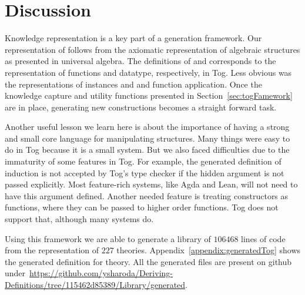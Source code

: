 \section{Discussion}
\label{sec:generation:discussion}
Knowledge representation is a key part of a generation framework. Our representation of  follows from the axiomatic representation of algebraic structures as presented in universal algebra. The definitions of  and  corresponds to the representation of functions and datatype, respectively, in Tog. Less obvious was the representations of instances  and  and function application. 
Once the knowledge capture and utility functions presented in Section~\ref{sec:togFamework} are in place, generating new constructions becomes a straight forward task. 

Another useful lesson we learn here is about the importance of having a strong and small core language for manipulating structures. Many things were easy to do in Tog because it is a small system. But we also faced difficulties due to the immaturity of some features in Tog.  
For example, the generated definition of induction is not accepted by Tog's type checker if the hidden argument  is not passed explicitly. Most feature-rich systems, like Agda and Lean, will not need to have this argument defined. Another needed feature is treating constructors as functions, where they can be passed to higher order functions. Tog does not support that, although many systems do.  

Using this framework we are able to generate a library of $106468$ lines of code from the representation of $227$ theories. Appendix~\ref{appendix:generatedTog} shows the generated definition for  theory. All the generated files are present on github under~\url{https://github.com/ysharoda/Deriving-Definitions/tree/115462d85389/Library/generated}. 
 
